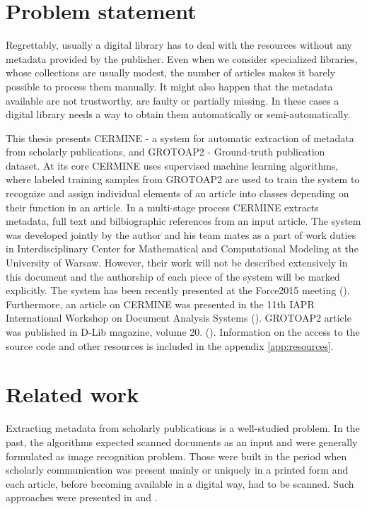 \section{Problem statement}
Regrettably, usually a digital library has to deal with the resources without any metadata provided by the publisher. Even when we consider specialized libraries, whose collections are usually modest, the number of articles makes it barely possible to process them manually. It might also happen that the metadata available are not trustworthy, are faulty or partially missing. In these cases a digital library needs a way to obtain them automatically or semi-automatically.

This thesis presents CERMINE - a system for automatic extraction of metadata from scholarly publications, and GROTOAP2 - Ground-truth publication dataset. At its core CERMINE uses supervised machine learning algorithms, where labeled training samples from GROTOAP2 are used to train the system to recognize and assign individual elements of an article into classes depending on their function in an article. In a multi-stage process CERMINE extracts metadata, full text and bilbiographic references from an input article. The system was developed jointly by the author and his team mates as a part of work duties in Interdisciplinary Center for Mathematical and Computational Modeling at the University of Warsaw. However, their work will not be described extensively in this document and the authorship of each piece of the system will be marked explicitly. The system has been recently presented at the Force2015 meeting (\cite{Force2015}). Furthermore, an article on CERMINE was presented in the 11th IAPR International Workshop on Document Analysis Systems (\cite{DominikaTkaczykPaweSzostekMateuszFedoryszakPiotrJanDendek2014}). GROTOAP2 article was published in D-Lib magazine, volume 20. (\cite{DominikaTkaczykPaweSzostek2014}).
Information on the access to the source code and other resources is included in the appendix \ref{app:resources}.

\section{Related work}
Extracting metadata from scholarly publications is a well-studied problem. In the past, the algorithms expected scanned documents as an input and were generally formulated as image recognition problem. Those were built in the period when scholarly communication was present mainly or uniquely in a printed form and each article, before becoming available in a digital way, had to be scanned. Such approaches were presented in \cite{Thoma2001} and \cite{Flynn2007}.

